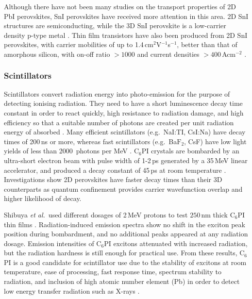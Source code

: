 Although there have not been many studies on the transport properties of 2D PbI perovskites, SnI perovskites have received more attention in this area. 2D SnI structures are semiconducting, while the 3D SnI perovskite is a low-carrier density p-type metal \cite{Mitzi1994}. Thin film transistors have also been produced from 2D SnI perovskites, with carrier mobilities of up to 1.4\,cm$^2$V$^{-1}$s$^{-1}$, better than that of amorphous silicon, with on-off ratio $>1000$ and current densities $>400$\,Acm$^{-2}$ \cite{Mitzi2002b, Mitzi2001d, Kagan1999a}.

\subsubsection{Scintillators}
Scintillators convert radiation energy into photo-emission for the purpose of detecting ionising radiation. They need to have a short luminescence decay time constant in order to react quickly, high resistance to radiation damage, and high efficiency so that a suitable number of photons are created per unit radiation energy of absorbed \cite{Shibuya2002}. Many efficient scintillators (e.g.\ NaI:TI, CsI:Na) have decay times of 200\,ns or more, whereas fast scintillators (e.g.\ Ba$\textrm{F}_2$, CsF) have low light yields of less than 2000~photons per MeV \cite{Kengo2002}. $\textrm{C}_6$PI crystals are bombarded by an ultra-short electron beam with pulse width of 1-2\,ps generated by a 35\,MeV linear accelerator, and produced a decay constant of 45\,ps at room temperature \cite{Kengo2002}. Investigations show 2D perovskites have faster decay times than their 3D counterparts as quantum confinement provides carrier wavefunction overlap and higher likelihood of decay.

Shibuya \textit{et al.}\ used different dosages of 2\,MeV protons to test $250$\,nm thick $\textrm{C}_6$PI thin films \cite{Shibuya2002}. Radiation-induced emission spectra show no shift in the exciton peak position during bombardment, and no additional peaks appeared at any radiation dosage. Emission intensities of $\textrm{C}_6$PI excitons attenuated with increased radiation, but the radiation hardness is still enough for practical use. From these results, $\textrm{C}_6$PI is a good candidate for scintillator use due to the stability of excitons at room temperature, ease of processing, fast response time, spectrum stability to radiation, and inclusion of high atomic number element (Pb) in order to detect low energy transfer radiation such as X-rays \cite{Shibuya2004}. 

